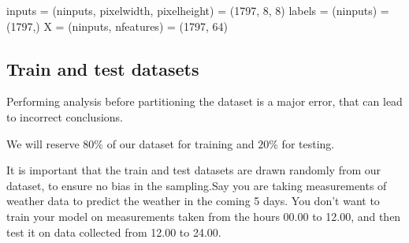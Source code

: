 \documentclass[letterpaper,10pt,english]{sphinxmanual}
\begin{document}
\begin{sphinxVerbatim}[commandchars=\\\{\}]
    \PYG{p}{[}\PYG{p}{]}
      
      
      \PYG{p}{[}\PYG{p}{[}\PYG{p}{]}\PYG{p}{]}
\end{sphinxVerbatim}

\begin{sphinxVerbatim}[commandchars=\\\{\}]
inputs = (n\PYGZus{}inputs, pixel\PYGZus{}width, pixel\PYGZus{}height) = (1797, 8, 8)
labels = (n\PYGZus{}inputs) = (1797,)
X = (n\PYGZus{}inputs, n\PYGZus{}features) = (1797, 64)
\end{sphinxVerbatim}

\noindent{}


\subsection{Train and test datasets}
\label{\detokenize{chapter6:train-and-test-datasets}}
Performing analysis before partitioning the dataset is a major error, that can lead to incorrect conclusions.

We will reserve \(80 \%\) of our dataset for training and \(20 \%\) for testing.

It is important that the train and test datasets are drawn randomly from our dataset, to ensure
no bias in the sampling.Say you are taking measurements of weather data to predict the weather in the coming 5 days.
You don’t want to train your model on measurements taken from the hours 00.00 to 12.00, and then test it on data
collected from 12.00 to 24.00.
\end{document}
